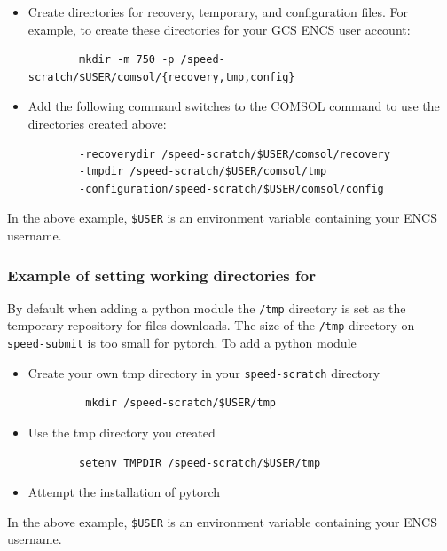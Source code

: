 \begin{itemize}
	\item 
	Create directories for recovery, temporary, and configuration files. 
	For example, to create these directories for your GCS ENCS user account:
	\begin{verbatim}
		mkdir -m 750 -p /speed-scratch/$USER/comsol/{recovery,tmp,config}
	\end{verbatim}
	\item
	Add the following command switches to the COMSOL command to use the 
	directories created above:
	\begin{verbatim} 
		-recoverydir /speed-scratch/$USER/comsol/recovery 
		-tmpdir /speed-scratch/$USER/comsol/tmp
		-configuration/speed-scratch/$USER/comsol/config
	\end{verbatim}
\end{itemize} 

In the above example, \verb!$USER! is an environment variable containing your ENCS username.

\subsubsection{Example of setting working directories for }
By default when adding a python module the \texttt{/tmp} directory is set as the temporary repository for files downloads. 
The size of the \texttt{/tmp} directory on \verb!speed-submit! is too small for pytorch.
To add a python module

\begin{itemize}
    \item 	
	Create your own tmp directory in your \verb!speed-scratch! directory
	\begin{verbatim} 
 		 mkdir /speed-scratch/$USER/tmp
	\end{verbatim}
	\item
  	Use the tmp directory you created
	\begin{verbatim} 
		setenv TMPDIR /speed-scratch/$USER/tmp
	\end{verbatim}
    \item
	Attempt the installation of pytorch
\end{itemize}

In the above example, \verb!$USER! is an environment variable containing your ENCS username.

